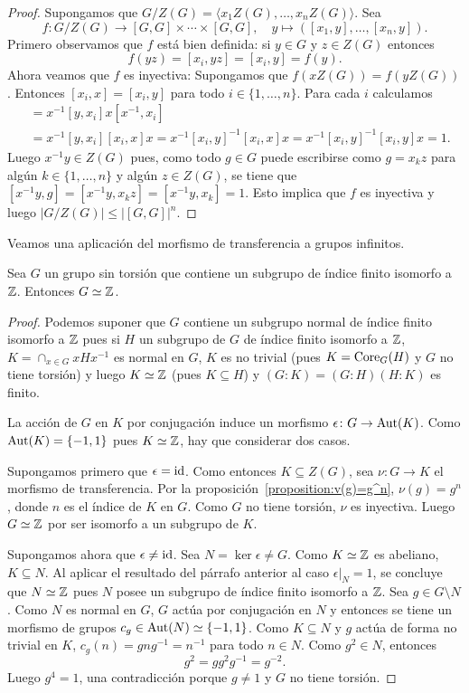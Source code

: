 \begin{proof}
	Supongamos que $G/Z(G)=\langle x_1Z(G),\dots,x_nZ(G)\rangle$. Sea 
	\[
		f\colon G/Z(G)\to [G,G]\times\cdots\times [G,G],
		\quad
		y\mapsto ([x_1,y],\dots,[x_n,y]).
	\]
	Primero observamos que $f$ está bien definida: si $y\in G$ y $z\in Z(G)$ entonces
	\[
		f(yz)=[x_i,yz]=[x_i,y]=f(y). 
	\]
	Ahora veamos que $f$ es inyectiva: Supongamos que $f(xZ(G))=f(yZ(G))$. Entonces
	$[x_i,x]=[x_i,y]$ para todo $i\in\{1,\dots,n\}$. Para cada $i$ calculamos
	\begin{align*}
		[x^{-1}y,x_i] &= x^{-1}[y,x_i]x[x^{-1},x_i]\\
		&=x^{-1}[y,x_i][x_i,x]x=x^{-1}[x_i,y]^{-1}[x_i,x]x=x^{-1}[x_i,y]^{-1}[x_i,y]x=1.
	\end{align*}
	Luego $x^{-1}y\in Z(G)$ pues, como 
	todo $g\in G$ puede escribirse como $g=x_kz$ para algún $k\in\{1,\dots,n\}$ y algún $z\in Z(G)$, se tiene
	que $[x^{-1}y,g]=[x^{-1}y,x_kz]=[x^{-1}y,x_k]=1$. Esto implica que $f$ es inyectiva y luego
	$|G/Z(G)|\leq |[G,G]|^n$. 
\end{proof}



Veamos una aplicación del morfismo de transferencia a grupos infinitos.

\begin{theorem}
	Sea $G$ un grupo sin torsión que contiene un subgrupo de índice finito
	isomorfo a $\mathbb{Z}$. Entonces $G\simeq\mathbb{Z}$.
\end{theorem}

\begin{proof}
	Podemos suponer que $G$ contiene un subgrupo normal de índice finito
	isomorfo a $\mathbb{Z}$ pues si $H$ un subgrupo de $G$ de índice finito isomorfo a
	$\mathbb{Z}$, $K=\cap_{x\in G}xHx^{-1}$ es normal en $G$, $K$ es no trivial (pues $K=\operatorname{Core}_G(H)$ y 
	$G$ no tiene torsión) y luego $K\simeq\mathbb{Z}$ (pues 
	$K\subseteq H$) y $(G:K)=(G:H)(H:K)$ es finito.

	La acción de $G$ en $K$ por conjugación induce un morfismo 
	$\epsilon\colon G\to\operatorname{Aut}(K)$. Como $\operatorname{Aut}(K)=\{-1,1\}$ pues $K\simeq\mathbb{Z}$, 
	hay que considerar dos casos. 
	
	Supongamos primero que $\epsilon=\operatorname{id}$. Como entonces $K\subseteq Z(G)$, sea
	$\nu\colon G\to K$ el morfismo de transferencia. Por la
	proposición~\ref{proposition:v(g)=g^n}, $\nu(g)=g^n$, donde $n$ es el
	índice de $K$ en $G$.  Como $G$ no tiene torsión, $\nu$ es inyectiva. Luego
	$G\simeq\mathbb{Z}$ por ser isomorfo a un subgrupo de $K$.

	Supongamos ahora que $\epsilon\ne\operatorname{id}$. Sea $N=\ker\epsilon\ne G$. Como
	$K\simeq\mathbb{Z}$ es abeliano, $K\subseteq N$. Al aplicar el resultado del
	párrafo anterior al caso $\epsilon|_N=1$, se concluye que $N\simeq\mathbb{Z}$ pues
	$N$ posee un subgrupo de índice finito isomorfo a $\mathbb{Z}$. Sea $g\in G\setminus N$. 
	Como $N$ es normal en $G$, $G$ actúa por conjugación en $N$ y entonces
	se tiene un morfismo de grupos $c_g\in\operatorname{Aut}(N)\simeq\{-1,1\}$. Como
	$K\subseteq N$ y $g$ actúa de forma no trivial en $K$, 
	$c_g(n)=gng^{-1}=n^{-1}$ para todo $n\in N$.  Como
	$g^2\in N$, entonces
	\[
		g^2=gg^2g^{-1}=g^{-2}.
	\]
	Luego $g^4=1$, una contradicción porque $g\ne1$ y $G$ no tiene torsión. 
\end{proof}


